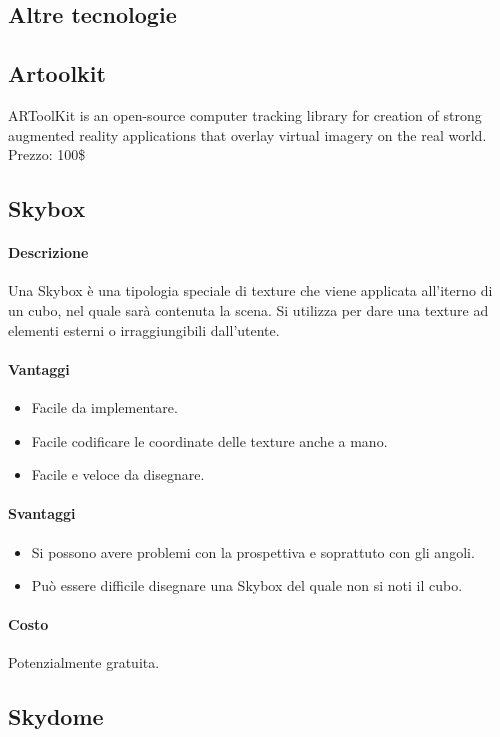 \documentclass[8pt]{extarticle}
\begin{document}
\begin{multicols}{3}
\section{Altre tecnologie}
\subsection{Artoolkit}
ARToolKit is an open-source computer tracking library for creation of strong augmented reality applications that overlay virtual imagery on the real world.
Prezzo: 100\$
\subsection{Skybox}
\paragraph{Descrizione} 
Una Skybox è una tipologia speciale di texture che viene applicata all'iterno di un 
cubo, nel quale sarà contenuta la scena. Si utilizza per dare una texture ad elementi
esterni o irraggiungibili dall'utente. 
\paragraph{Vantaggi}
\begin{itemize}
    \item Facile da implementare.
    \item Facile codificare le coordinate delle texture anche a mano.
    \item Facile e veloce da disegnare.
\end{itemize}
\paragraph{Svantaggi}
\begin{itemize}
    \item Si possono avere problemi con la prospettiva e soprattuto con gli angoli.
    \item Può essere difficile disegnare una Skybox del quale non si noti il cubo.
\end{itemize}
\paragraph{Costo} Potenzialmente gratuita.

\subsection{Skydome}

\end{multicols}
\end{document}
